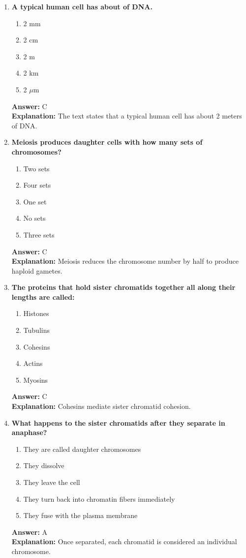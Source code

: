\documentclass[11pt, a4paper]{article}
\begin{document}
\begin{enumerate}[leftmargin=*, label=\arabic*.]
\item \textbf{A typical human cell has about \underline{\hspace{1cm}} of DNA.}
\begin{enumerate}[label=\Alph*.]
\item 2 mm
\item 2 cm
\item 2 m
\item 2 km
\item 2 $\mu$m
\end{enumerate}
\textbf{Answer:} C \\
\textbf{Explanation:} The text states that a typical human cell has about 2 meters of DNA.

\item \textbf{Meiosis produces daughter cells with how many sets of chromosomes?}
\begin{enumerate}[label=\Alph*.]
\item Two sets
\item Four sets
\item One set
\item No sets
\item Three sets
\end{enumerate}
\textbf{Answer:} C \\
\textbf{Explanation:} Meiosis reduces the chromosome number by half to produce haploid gametes.

\item \textbf{The proteins that hold sister chromatids together all along their lengths are called:}
\begin{enumerate}[label=\Alph*.]
\item Histones
\item Tubulins
\item Cohesins
\item Actins
\item Myosins
\end{enumerate}
\textbf{Answer:} C \\
\textbf{Explanation:} Cohesins mediate sister chromatid cohesion.

\item \textbf{What happens to the sister chromatids after they separate in anaphase?}
\begin{enumerate}[label=\Alph*.]
\item They are called daughter chromosomes
\item They dissolve
\item They leave the cell
\item They turn back into chromatin fibers immediately
\item They fuse with the plasma membrane
\end{enumerate}
\textbf{Answer:} A \\
\textbf{Explanation:} Once separated, each chromatid is considered an individual chromosome.


\end{enumerate}
\end{document}
